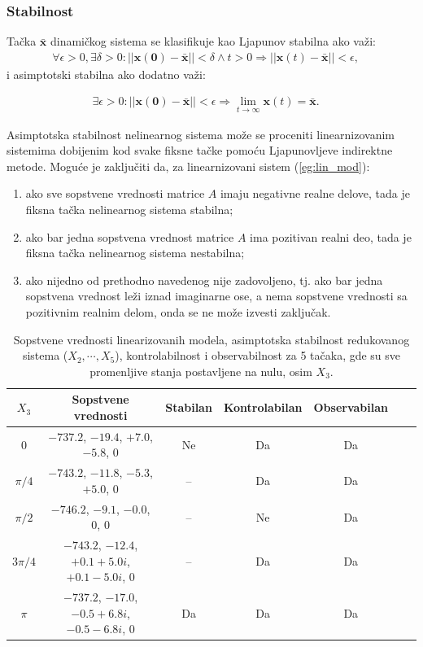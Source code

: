\documentclass[a4paper,11pt]{article}
\theoremstyle{definition} \newtheorem{deff}{Definicija}[section]
\theoremstyle{definition} \newtheorem{prim}[deff]{Primer}
\theoremstyle{plain} \newtheorem{teor}[deff]{Teorema}
\newcommand{\vect}[1]{\boldsymbol{\mathbf{#1}}}
\begin{document}
	\subsubsection{Stabilnost}
	
	
	
	Tačka \(\vect{\bar{x}}\) dinamičkog sistema se klasifikuje kao Ljapunov stabilna ako važi:
	\begin{align}
		\forall \epsilon > 0, \exists \delta > 0 : ||\vect{x(0)} - \vect{\bar{x}}|| < \delta \land t > 0 \Rightarrow ||\vect{x}(t) - \vect{\bar{x}}|| < \epsilon, \quad 
	\end{align}
	i asimptotski stabilna ako dodatno važi:
	
	\begin{align}
		\exists \epsilon > 0 : ||\vect{x(0)} - \vect{\bar{x}}|| < \epsilon \Rightarrow \lim_{t \to \infty} \vect{x}(t) = \vect{\bar{x}}. \quad
	\end{align}
	
	Asimptotska stabilnost nelinearnog sistema može se proceniti linearnizovanim sistemima dobijenim kod svake fiksne tačke pomoću Ljapunovljeve indirektne metode. Moguće je zaključiti da, za linearnizovani sistem (\ref{eg:lin_mod}):
	\begin{enumerate}
		\item ako sve sopstvene vrednosti matrice \(A\) imaju negativne realne delove, tada je fiksna tačka nelinearnog sistema stabilna;
		\item ako bar jedna sopstvena vrednost matrice \(A\) ima pozitivan realni deo, tada je fiksna tačka nelinearnog sistema nestabilna;
		\item ako nijedno od prethodno navedenog nije zadovoljeno, tj. ako bar jedna sopstvena vrednost leži iznad imaginarne ose, a nema sopstvene vrednosti sa pozitivnim realnim delom, onda se ne može izvesti zaključak.
	\end{enumerate} 
	
	
	
	\begin{table}[H]
		\centering
		\caption{Sopstvene vrednosti linearizovanih modela, asimptotska stabilnost redukovanog sistema ($X_2, \cdots, X_5$), kontrolabilnost i observabilnost za 5 tačaka, gde su sve promenljive stanja postavljene na nulu, osim $X_3$.}
		\label{table:eigenvalues}
		\begin{tabular}{c c c c c c c}
			\hline
			$X_3$ & Sopstvene vrednosti & Stabilan & Kontrolabilan & Observabilan \\
			\hline
			0 & $-737.2$, $-19.4$, $+7.0$, $-5.8$, $0$ & Ne & Da & Da \\
			$\pi/4$ & $-743.2$, $-11.8$, $-5.3$, $+5.0$, $0$ & -- & Da & Da \\
			$\pi/2$ & $-746.2$, $-9.1$, $-0.0$, $0$, $0$ & -- & Ne & Da \\
			$3\pi/4$ & $-743.2$, $-12.4$, $+0.1 + 5.0i$, $+0.1 - 5.0i$, $0$ & -- & Da & Da \\
			$\pi$ & $-737.2$, $-17.0$, $-0.5 + 6.8i$, $-0.5 - 6.8i$, $0$ & Da & Da & Da \\
			\hline
		\end{tabular}
		\label{tab:5_tacaka}
	\end{table}
	
\end{document}
